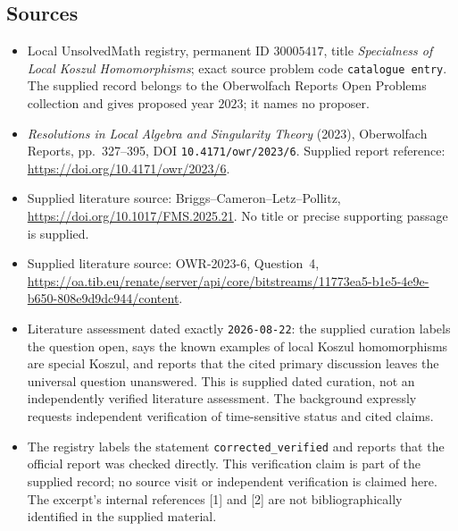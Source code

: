 \documentclass[11pt]{article}
\begin{document}
\subsection{Sources}
\begin{itemize}
\item Local UnsolvedMath registry, permanent ID \(30005417\), title \emph{Specialness of Local Koszul Homomorphisms}; exact source problem code \texttt{catalogue entry}. The supplied record belongs to the Oberwolfach Reports Open Problems collection and gives proposed year \(2023\); it names no proposer.
\item \emph{Resolutions in Local Algebra and Singularity Theory} (2023), Oberwolfach Reports, pp.~327--395, DOI \texttt{10.4171/owr/2023/6}. Supplied report reference: \url{https://doi.org/10.4171/owr/2023/6}.
\item Supplied literature source: Briggs--Cameron--Letz--Pollitz, \url{https://doi.org/10.1017/FMS.2025.21}. No title or precise supporting passage is supplied.
\item Supplied literature source: OWR-2023-6, Question~4, \url{https://oa.tib.eu/renate/server/api/core/bitstreams/11773ea5-b1e5-4e9e-b650-808e9d9dc944/content}.
\item Literature assessment dated exactly \texttt{2026-08-22}: the supplied curation labels the question open, says the known examples of local Koszul homomorphisms are special Koszul, and reports that the cited primary discussion leaves the universal question unanswered. This is supplied dated curation, not an independently verified literature assessment. The background expressly requests independent verification of time-sensitive status and cited claims.
\item The registry labels the statement \texttt{corrected\_verified} and reports that the official report was checked directly. This verification claim is part of the supplied record; no source visit or independent verification is claimed here. The excerpt's internal references [1] and [2] are not bibliographically identified in the supplied material.
\end{itemize}
\end{document}
